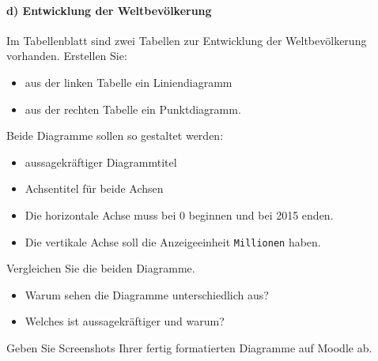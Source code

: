 \begin{myexercise}[Diagramme]
    \paragraph*{d) Entwicklung der Weltbevölkerung}
    Im Tabellenblatt sind zwei Tabellen zur Entwicklung der Weltbevölkerung vorhanden. Erstellen Sie:
    \begin{itemize}
        \item aus der linken Tabelle ein Liniendiagramm
        \item aus der rechten Tabelle ein Punktdiagramm.
    \end{itemize}
    Beide Diagramme sollen so gestaltet werden:
    \begin{itemize}
        \item aussagekräftiger Diagrammtitel
        \item Achsentitel für beide Achsen
        \item Die horizontale Achse muss bei 0 beginnen und bei 2015 enden.
        \item Die vertikale Achse soll die Anzeigeeinheit \texttt{Millionen} haben.
    \end{itemize}

    Vergleichen Sie die beiden Diagramme.
    \begin{itemize}
        \item Warum sehen die Diagramme unterschiedlich aus?
        \item Welches ist aussagekräftiger und warum?
    \end{itemize}

    Geben Sie Screenshots Ihrer fertig formatierten Diagramme auf Moodle ab.

    \begin{myanswer}


\end{myanswer}
\end{myexercise}
